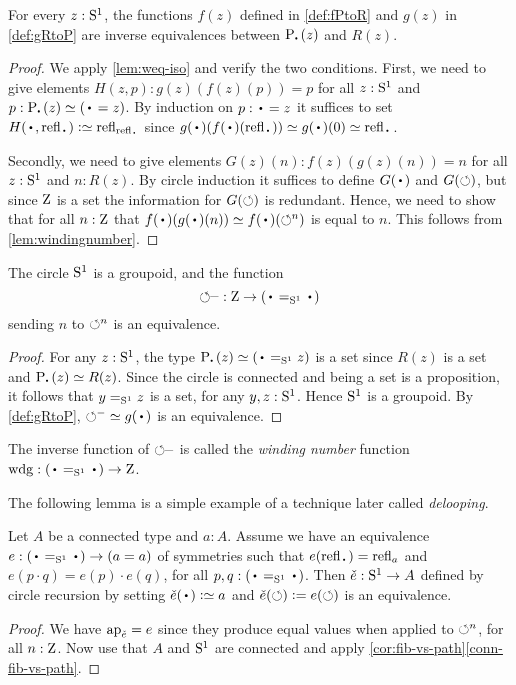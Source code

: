 \begin{theorem}
  \label{lem:univisexp}
For every $z:{\mathrm{S}^1}$, the functions $f(z)$ defined in \cref{def:fPtoR}
and $g(z)$ in \cref{def:gRtoP} are inverse equivalences between
$\uc{\base}(z)$ and $R(z)$.
\end{theorem}
\begin{proof}
We apply \cref{lem:weq-iso} and verify the two conditions.
  First, we need to give elements $H(z,p):g(z)(f(z)(p))=p$
for all $z:{\mathrm{S}^1}$ and $p:\uc{\base}(z)\jdeq(\base=z)$.
By induction on $p:\base=z$ it suffices to set
$H(\base,\refl\base)\defeq\refl{\refl{\base}}$ since
$g(\base)(f(\base)(\refl{\base}))\jdeq g(\base)(0)\jdeq\refl{\base}$.

Secondly, we need to give elements $G(z)(n):f(z)(g(z)(n))=n$
for all $z:{\mathrm{S}^1}$ and $n: R(z)$.
By circle induction it suffices to define $G(\base)$ and $G(\circlearrowleft)$,
but since $\mathrm{Z}$ is a set the information for $G(\circlearrowleft)$ is redundant.
Hence, we need to show that for all $n:\mathrm{Z}$ that
$f(\base)(g(\base)(n))\jdeq  f(\base)(\Sloop^n)$ is equal to $n$.
This follows from \cref{lem:windingnumber}.
\end{proof}


\begin{corollary}\label{cor:S1groupoid}
The circle ${\mathrm{S}^1}$ is a groupoid, and the function
\[
{\Sloop}^{\blank} : \zet\to(\base=_{\Sc}\base)
\]
sending $n$ to $\circlearrowleft^n$ is an equivalence.
\end{corollary}
\begin{proof}
For any $z:{\mathrm{S}^1}$, the type $\uc{\base}(z)\jdeq (\base=_{\Sc}z)$ is a set
since $R(z)$ is a set and $\uc{\base}(z) \equiv R(z)$.
Since the circle is connected and being a set is a proposition, it follows
that $y=_{{\mathrm{S}^1}}z$ is a set, for any $y,z:{\mathrm{S}^1}$. Hence ${\mathrm{S}^1}$ is a groupoid.
By \cref{def:gRtoP}, ${\Sloop}^{-}\jdeq g(\base)$ is an equivalence.
\end{proof}
\begin{definition}\label{def:windingnumber}
  The inverse function of ${\circlearrowleft}^{\_}$
  is called the \emph{winding number} function
  $\wdg : (\base =_\Sc\base) \to \zet$.
\end{definition}
The following lemma is a simple example of a technique later called \emph{delooping}.
\begin{lemma}\label{lem:S1-delooping}
Let $A$ be a connected type and $a:A$.
Assume we have an equivalence $e:(\base=_{\Sc}\base) \to (a=a)$
of symmetries such that $e(\refl{\base})=\refl{a}$
and $e(p\cdot q)=e(p)\cdot e(q)$, for all $p,q:(\base=_{\Sc}\base)$.
Then $\check e : {\mathrm{S}^1}\to A$ defined by circle recursion by setting
$\check e(\base)\defeq a$ and $\check e(\circlearrowleft)\mathrel{\vcentcolon=} e(\circlearrowleft)$
is an equivalence.
\end{lemma}
\begin{proof}
We have $\ap{\check e} = e$ since they produce equal values when applied
to $\circlearrowleft^n$, for all $n:\mathrm{Z}$. Now use that $A$ and ${\mathrm{S}^1}$ are connected and
apply \cref{cor:fib-vs-path}\ref{conn-fib-vs-path}.
\end{proof}

